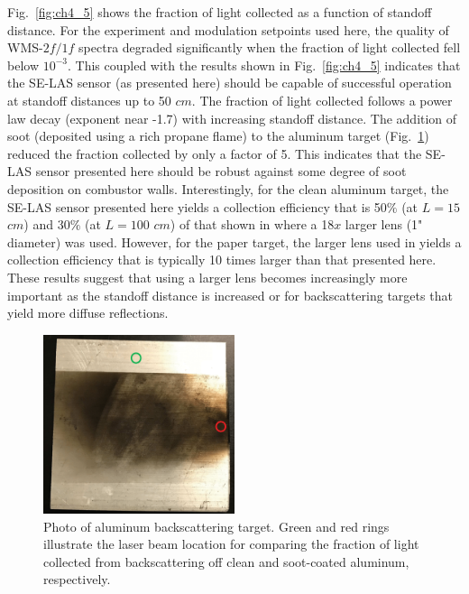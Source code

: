 Fig.\ \ref{fig:ch4_5} shows the fraction of light collected as a function of standoff distance. For the experiment and modulation setpoints used here, the quality of WMS-$2f/1f$ spectra degraded significantly when the fraction of light collected fell below $10^{-3}$. This coupled with the results shown in Fig.\ \ref{fig:ch4_5} indicates that the SE-LAS sensor (as presented here) should be capable of successful operation at standoff distances up to 50 $cm$. The fraction of light collected follows a power law decay (exponent near -1.7) with increasing standoff distance. The addition of soot (deposited using a rich propane flame) to the aluminum target (Fig.\ \ref{fig:ch4_6}) reduced the fraction collected by only a factor of 5. This indicates that the SE-LAS sensor presented here should be robust against some degree of soot deposition on combustor walls. Interestingly, for the clean aluminum target, the SE-LAS sensor presented here yields a collection efficiency that is 50$\%$ (at $L=15$ $cm$) and 30$\%$ (at $L=100$ $cm$) of that shown in \cite{Goldenstein:16} where a 18$x$ larger lens (1" diameter) was used. However, for the paper target, the larger lens used in \cite{Goldenstein:16} yields a collection efficiency that is typically 10 times larger than that presented here. These results suggest that using a larger lens becomes increasingly more important as the standoff distance is increased or for backscattering targets that yield more diffuse reflections.

\vspace{5mm}

 \begin{figure}[h]
    \centering
        \includegraphics[width=0.5\textwidth]{fig/ch4_fig12.png}
        \caption{Photo of aluminum backscattering target. Green and red rings illustrate the laser beam location for comparing the fraction of light collected from backscattering off clean and soot-coated aluminum, respectively.}
    \label{fig:ch4_6}
\end{figure}


